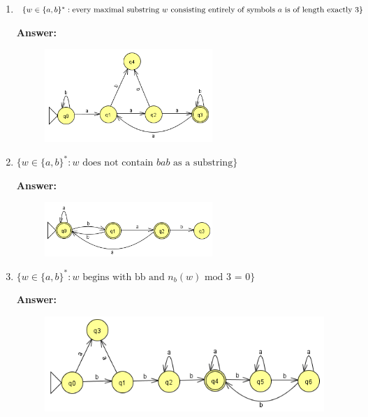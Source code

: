 \documentclass[12pt]{article}
\begin{document}
\begin{enumerate}
\begin{enumerate}
		      \item $\{w \in \{a,b \}^* : \text{every maximal substring } w \text{ consisting entirely of symbols } a \\ \text{ is of length exactly 3} \}$

		            \noindent \textbf{Answer:}

		            \begin{figure}[h!]
			            \centering
			            \includegraphics[width=0.6\textwidth]{img/q3/q3_b.png}
		            \end{figure}

		      \item $\{w \in \{a,b \}^* : \text{$w$ does not contain $bab$ as a substring} \}$

		            \noindent \textbf{Answer:}

		            \begin{figure}[h!]
			            \centering
			            \includegraphics[width=0.6\textwidth]{img/q3/q3_c.png}
		            \end{figure}

		      \item $\{w \in \{a,b \}^* : \text{$w$ begins with bb and $n_b(w)$ mod 3 = 0} \}$

		            \noindent \textbf{Answer:}

		            \begin{figure}[h!]
			            \centering
			            \includegraphics[width=0.75	\textwidth]{img/q3/q3_d.png}
		            \end{figure}


\end{enumerate}
\end{enumerate}
\end{document}
